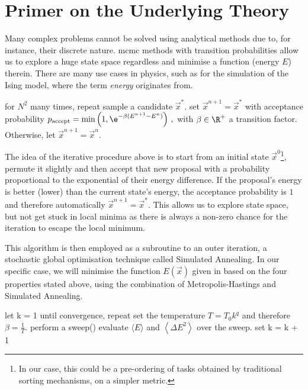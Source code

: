 \section{Primer on the Underlying Theory}
\label{sec:theory}
Many complex problems cannot be solved using analytical methods due to, for instance, their discrete nature.
\gls{mcmc} methods with transition probabilities allow us to explore a huge state space regardless and minimise a function (energy $E$) therein.
There are many use cases in physics, such as for the simulation of the Ising model, where the term \textit{energy} originates from.

\begin{algorithm}[language=pseudo,caption={\centering The Metropolis-Hastings sweep() sub-routine \parencite{metropolis, hastings}},basicstyle=\footnotesize]
for $N^2$ many times, repeat
  sample a candidate $\vec{x}^*$.
  set $\vec{x}^{n+1} = \vec{x}^*$ with acceptance probability
    $p_{\rm accept} = \min\left(1, \e^{-\beta (E^{n+1} - E^n)}\right)\,,$ with $\beta \in \R^+$ a transition factor.
  Otherwise, let $\vec{x}^{n+1} = \vec{x}^{n}$.
\end{algorithm}

The idea of the iterative procedure above is to start from an initial state $\vec{x}^0$\footnote{In our case, this could be a pre-ordering of tasks obtained by traditional sorting mechanisms, on a simpler metric.}, permute it slightly and then accept that new proposal with a probability proportional to the exponential of their energy difference.
If the proposal's energy is better (lower) than the current state's energy, the acceptance probability is $1$ and therefore automatically $\vec{x}^{n+1} = \vec{x}^*$.
This allows us to explore state space, but not get stuck in local minima as there is always a non-zero chance for the iteration to escape the local minimum.

This algorithm is then employed as a subroutine to an outer iteration, a stochastic global optimisation technique called Simulated Annealing.
In our specific case, we will minimise the function $E(\vec{x})$ given in  based on the four properties stated above, using the combination of Metropolis-Hastings and Simulated Annealing.

\begin{algorithm}[language=pseudo,caption={\centering Simulated Annealing},basicstyle=\footnotesize]
let k = 1
until convergence, repeat
  set the temperature $T = T_0 k^{q}$ and therefore $\beta = \frac{1}{T}$.
  perform a sweep()
  evaluate $\langle E\rangle$ and $\left\langle\Delta E^2\right\rangle$ over the sweep.
  set k = k + 1
\end{algorithm}

